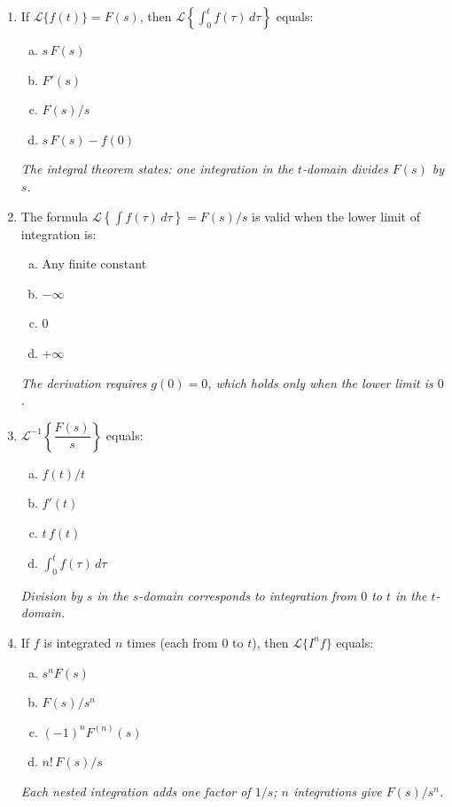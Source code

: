 \documentclass[12pt,a4paper]{article}
\begin{document}
\begin{enumerate}[label=\textbf{MCQ \arabic*.}, leftmargin=*, itemsep=14pt]

\item If $\mathcal{L}\{f(t)\} = F(s)$, then
  $\mathcal{L}\!\left\{\displaystyle\int_0^t f(\tau)\,d\tau\right\}$ equals:
  \begin{enumerate}[(a)]
    \item $s\,F(s)$
    \item $F'(s)$
    \item \textbf{$F(s)/s$}
    \item $s\,F(s) - f(0)$
  \end{enumerate}
  \textit{The integral theorem states: one integration in the $t$-domain divides $F(s)$
  by $s$.}

\item The formula $\mathcal{L}\!\left\{\int f(\tau)\,d\tau\right\} = F(s)/s$ is valid
  when the lower limit of integration is:
  \begin{enumerate}[(a)]
    \item Any finite constant
    \item $-\infty$
    \item \textbf{$0$}
    \item $+\infty$
  \end{enumerate}
  \textit{The derivation requires $g(0) = 0$, which holds only when the lower limit is $0$.}

\item $\mathcal{L}^{-1}\!\left\{\dfrac{F(s)}{s}\right\}$ equals:
  \begin{enumerate}[(a)]
    \item $f(t)/t$
    \item $f'(t)$
    \item $t\,f(t)$
    \item \textbf{$\displaystyle\int_0^t f(\tau)\,d\tau$}
  \end{enumerate}
  \textit{Division by $s$ in the $s$-domain corresponds to integration from $0$ to $t$
  in the $t$-domain.}

\item If $f$ is integrated $n$ times (each from $0$ to $t$), then
  $\mathcal{L}\{I^n f\}$ equals:
  \begin{enumerate}[(a)]
    \item $s^n F(s)$
    \item \textbf{$F(s)/s^n$}
    \item $(-1)^n F^{(n)}(s)$
    \item $n!\,F(s)/s$
  \end{enumerate}
  \textit{Each nested integration adds one factor of $1/s$; $n$ integrations give $F(s)/s^n$.}


\end{enumerate}
\end{document}

